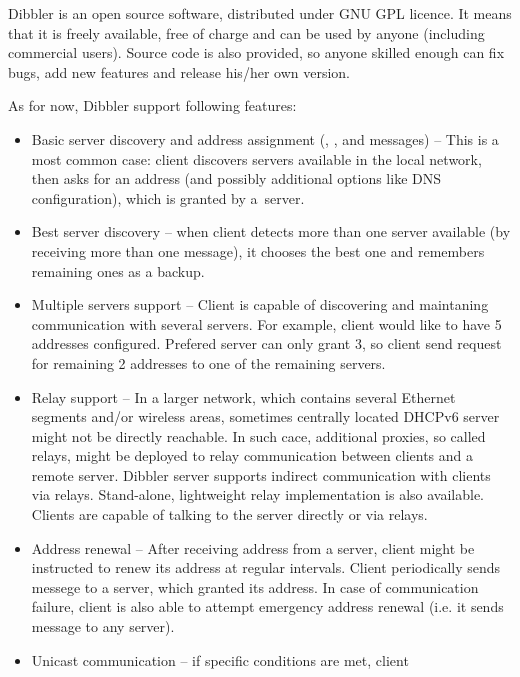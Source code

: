 Dibbler is an open source software, distributed under GNU GPL
licence. It means that it is freely available, free of charge and can
be used by anyone (including commercial users). Source code is also
provided, so anyone skilled enough can fix bugs, add new features and
release his/her own version.


As for now, Dibbler support following features:
\begin{itemize}
\item Basic server discovery and address assignment (,
      ,  and  messages) -- This
      is a most common case: client discovers servers available in the
      local network, then asks for an address (and possibly additional
      options like DNS configuration), which is granted by a~server.
\item Best server discovery -- when client detects more than one
      server available (by receiving more than one 
      message), it chooses the best one and remembers remaining
      ones as a backup.
\item Multiple servers support -- Client is capable of discovering and
      maintaning communication with several servers. For example, client
      would like to have 5 addresses configured. Prefered server can
      only grant 3, so client send request for remaining 2 addresses to
      one of the remaining servers.
\item Relay support -- In a larger network, which contains several
      Ethernet segments and/or wireless areas, sometimes centrally
      located DHCPv6 server might not be directly reachable. In such
      cace, additional proxies, so called relays, might be deployed to
      relay communication between clients and a remote server. Dibbler
      server supports indirect communication with clients via
      relays. Stand-alone, lightweight relay implementation is also
      available. Clients are capable of talking to the server directly
      or via relays.
\item Address renewal -- After receiving address from a server, client
      might be instructed to renew its address at regular
      intervals. Client periodically sends  messege to a
      server, which granted its address. In case of communication
      failure, client is also able to attempt emergency address renewal
      (i.e. it sends  message to any server).
\item Unicast communication -- if specific conditions are met, client

\end{itemize}
